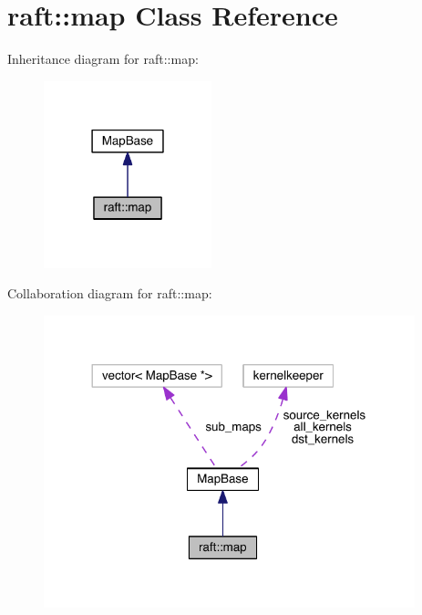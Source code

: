 \hypertarget{classraft_1_1map}{}\section{raft\+:\+:map Class Reference}
\label{classraft_1_1map}


Inheritance diagram for raft\+:\+:map\+:
\nopagebreak
\begin{figure}[H]
\begin{center}
\leavevmode
\includegraphics[width=138pt]{classraft_1_1map__inherit__graph}
\end{center}
\end{figure}


Collaboration diagram for raft\+:\+:map\+:
\nopagebreak
\begin{figure}[H]
\begin{center}
\leavevmode
\includegraphics[width=305pt]{classraft_1_1map__coll__graph}
\end{center}
\end{figure}
